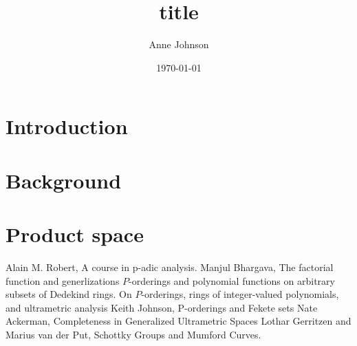 \documentclass[12pt]{report}
\title{title}
\author{Anne Johnson}
\date{\today}
\theoremstyle{definition}
\begin{document}



\chapter*{Introduction}

\chapter*{Background}


\chapter*{Product space}

%
%


%
%

%	
\begin{thebibliography}{1}
 Alain M. Robert, A course in p-adic analysis.
 Manjul Bhargava, The factorial function and generlizations
 $P$-orderings and polynomial functions on arbitrary subsets of Dedekind rings.
 On $ P$-orderings, rings of integer-valued polynomials, and ultrametric analysis
 Keith Johnson, P-orderings and Fekete sets
 Nate Ackerman,  Completeness in Generalized Ultrametric Spaces
 Lothar Gerritzen and Marius van der Put, Schottky Groups and Mumford Curves.
\end{thebibliography}
\end{document}
